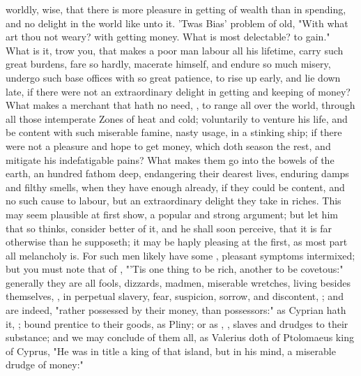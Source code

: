 worldly, wise, that there is more pleasure in getting of wealth than in
spending, and no delight in the world like unto it. 'Twas
Bias' problem of old, "With what art thou not weary? with
getting money. What is most delectable? to gain." What is it, trow you, that
makes a poor man labour all his lifetime, carry such great burdens, fare so
hardly, macerate himself, and endure so much misery, undergo such base offices
with so great patience, to rise up early, and lie down late, if there were not
an extraordinary delight in getting and keeping of money? What makes a merchant
that hath no need, , to range all over the world,
through all those intemperate Zones of heat and cold;
voluntarily to venture his life, and be content with such miserable famine,
nasty usage, in a stinking ship; if there were not a pleasure and hope to get
money, which doth season the rest, and mitigate his indefatigable pains? What
makes them go into the bowels of the earth, an hundred fathom deep, endangering
their dearest lives, enduring damps and filthy smells, when they have enough
already, if they could be content, and no such cause to labour, but an
extraordinary delight they take in riches. This may seem plausible at first
show, a popular and strong argument; but let him that so thinks, consider
better of it, and he shall soon perceive, that it is far otherwise than he
supposeth; it may be haply pleasing at the first, as most part all melancholy
is. For such men likely have some , pleasant symptoms
intermixed; but you must note that of \Chrysostom{}, "'Tis
one thing to be rich, another to be covetous:" generally they are all fools,
dizzards, madmen, miserable wretches, living besides
themselves, , in perpetual slavery, fear, suspicion,
sorrow, and discontent, ; and are indeed,
"rather possessed by their money, than possessors:" as
Cyprian hath it, ; bound prentice
to their goods, as Pliny; or as \Chrysostom{}, , slaves and drudges to their substance; and we may conclude of them
all, as Valerius doth of Ptolomaeus king of Cyprus, "He
was in title a king of that island, but in his mind, a miserable drudge of
money:"

